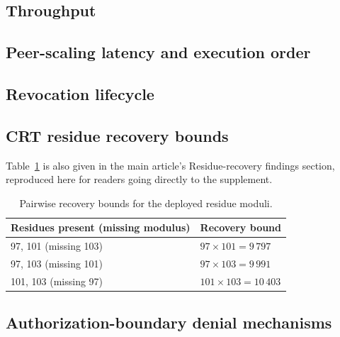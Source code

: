 \subsection{Throughput}



\subsection{Peer-scaling latency and execution order}







\subsection{Revocation lifecycle}



\begin{widefig}
\centering
{}
\caption{Gossip propagation across \RevEvents{} revocation-lifecycle events.}
\label{fig:revocation}
\end{widefig}

\subsection{CRT residue recovery bounds}

Table~\ref{tab:crtpairs} is also given in the main article's
Residue-recovery findings section, reproduced here for readers going
directly to the supplement.

\begin{table}[t]
\caption{Pairwise recovery bounds for the deployed residue moduli.}
\label{tab:crtpairs}
\small
\begin{tabularx}{\columnwidth}{@{}lX@{}}
\toprule
Residues present (missing modulus) & Recovery bound \\
\midrule
97, 101 (missing 103) & $97\times 101 = 9\,797$ \\
97, 103 (missing 101) & $97\times 103 = 9\,991$ \\
101, 103 (missing 97) & $101\times 103 = 10\,403$ \\
\bottomrule
\end{tabularx}
\end{table}

\subsection{Authorization-boundary denial mechanisms}


